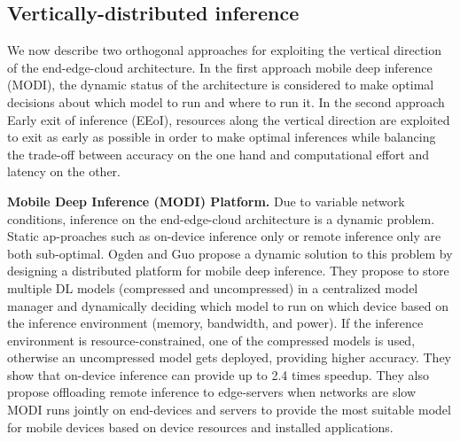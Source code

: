 \documentclass[letterpaper, 10 pt, conference]{ieeeconf}
\begin{document}
\subsection{Vertically-distributed inference}
We now describe two orthogonal approaches for exploiting the vertical direction of the end-edge-cloud architecture. In the first approach mobile deep inference (MODI), the dynamic status of the architecture is considered to make optimal decisions about which model to run and where to run it. In the second approach Early exit of inference (EEoI), resources along the vertical direction are exploited to exit as early as possible in order to make optimal inferences while balancing the trade-off between accuracy on the one hand and computational effort and latency on the other.

\textbf{Mobile Deep Inference (MODI) Platform.} Due to variable network conditions, inference on the end-edge-cloud architecture is a dynamic problem. Static ap-proaches such as on-device inference only or remote inference only are both sub-optimal. Ogden and Guo\cite{Ogden_Guo_2018} propose a dynamic solution to this problem by designing a distributed platform for mobile deep inference. They propose to store multiple DL models (compressed and uncompressed) in a centralized model manager and dynamically deciding which model to run on which device based on the inference environment (memory, bandwidth, and power). If the inference environment is resource-constrained, one of the compressed models is used, otherwise an uncompressed model gets deployed, providing higher accuracy. They show that on-device inference can provide up to 2.4 times speedup. They also propose offloading remote inference to edge-servers when networks are slow MODI runs jointly on end-devices and servers to provide the most suitable model for mobile devices based on device resources and installed applications.
\end{document}
